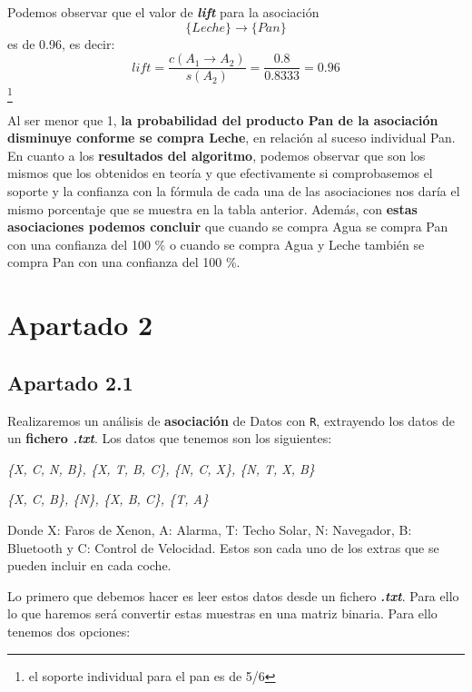 \documentclass [a4paper] {article}
\begin{document}
Podemos observar que el valor de \textbf{\textit{lift}} para la asociación \begin{equation*} \{Leche\} \rightarrow \{Pan\} \end{equation*} es de 0.96, es decir:
\hfil \begin{equation*} lift = \dfrac{c(A_1 \rightarrow A_2)}{s(A_2)} = \dfrac{0.8}{0.8333 } = 0.96 \end{equation*} 
\footnote{el soporte individual para el pan es de 5/6} \par \leavevmode

Al ser menor que 1, \textbf{la probabilidad del producto Pan de la asociación disminuye conforme se compra Leche}, en relación al suceso individual Pan. \\

En cuanto a los \textbf{resultados del algoritmo}, podemos observar que son los mismos que los obtenidos en teoría y que efectivamente si comprobasemos 
el soporte y la confianza con la fórmula de cada una de las asociaciones nos daría el mismo porcentaje que se muestra en la tabla anterior. 
Además, con \textbf{estas asociaciones podemos concluir} que cuando se compra Agua se compra Pan con una confianza del 100 \% o cuando se compra Agua y Leche 
también se compra Pan con una confianza del 100 \%.

\section{Apartado 2}

\subsection{Apartado 2.1}
Realizaremos un análisis de \textbf{asociación} de Datos con \texttt{R}, extrayendo los datos de un \textbf{fichero \textit{.txt}}. 
Los datos que tenemos son los siguientes: \newline

\hfil \textit{\{X, C, N, B\}, \{X, T, B, C\}, \{N, C, X\}, \{N, T, X, B\}} \par
\hfil \textit{\{X, C, B\}, \{N\}, \{X, B, C\}, \{T, A\}} \par \leavevmode

Donde X: Faros de Xenon, A: Alarma, T: Techo Solar, N: Navegador, B: Bluetooth y C: Control de Velocidad. 
Estos son cada uno de los extras que se pueden incluir en cada coche.

Lo primero que debemos hacer es leer estos datos desde un fichero \textbf{\textit{.txt}}. Para ello lo que haremos será convertir
estas muestras en una matriz binaria. Para ello tenemos dos opciones:
\end{document}
